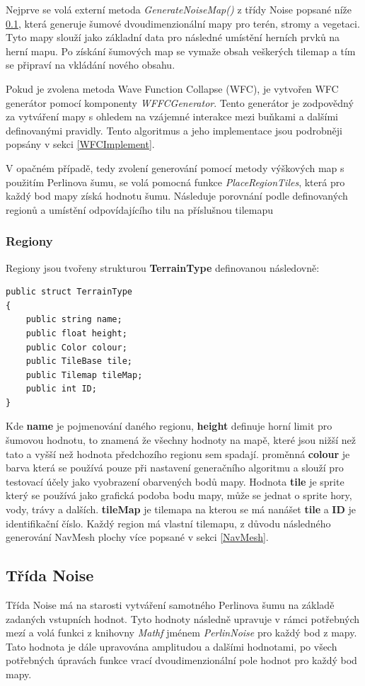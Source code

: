 Nejprve se volá externí metoda \textit{GenerateNoiseMap()} z třídy Noise popsané níže \ref{noiseClass}, která generuje šumové dvoudimenzionální mapy pro terén, stromy a vegetaci. Tyto mapy slouží jako základní data pro následné umístění herních prvků na herní mapu. Po získání šumových map se vymaže obsah veškerých tilemap a tím se připraví na vkládání nového obsahu.

Pokud je zvolena metoda Wave Function Collapse (WFC), je vytvořen WFC generátor pomocí komponenty \textit{WFFCGenerator}. Tento generátor je zodpovědný za vytváření mapy s ohledem na vzájemné interakce mezi buňkami a dalšími definovanými pravidly. Tento algoritmus a jeho implementace jsou podrobněji popsány v sekci \ref{WFCImplement}.

V opačném případě, tedy zvolení generování pomocí metody výškových map s použitím Perlinova šumu, se volá pomocná funkce \textit{PlaceRegionTiles}, která pro každý bod mapy získá hodnotu šumu. Následuje porovnání podle definovaných regionů a umístění odpovídajícího tilu na příslušnou tilemapu

\subsubsection{Regiony}
Regiony jsou tvořeny strukturou \textbf{TerrainType} definovanou následovně:
\begin{lstlisting}
public struct TerrainType
{
	public string name;
	public float height;
	public Color colour;
	public TileBase tile;
	public Tilemap tileMap;
	public int ID;
}
\end{lstlisting}
Kde \textbf{name} je pojmenování daného regionu, \textbf{height} definuje horní limit pro šumovou hodnotu, to znamená že všechny hodnoty na mapě, které jsou nižší než tato a vyšší než hodnota předchozího regionu sem spadají. proměnná \textbf{colour} je barva která se používá pouze při nastavení generačního algoritmu a slouží pro testovací účely jako vyobrazení obarvených bodů mapy. Hodnota \textbf{tile} je sprite který se používá jako grafická podoba bodu mapy, může se jednat o sprite hory, vody, trávy a dalších. \textbf{tileMap} je tilemapa na kterou se má nanášet \textbf{tile} a \textbf{ID} je identifikační číslo. Každý region má vlastní tilemapu, z důvodu následného generování NavMesh plochy více popsané v sekci \ref{NavMesh}.
 
\subsection{Třída Noise}
\label{noiseClass}
Třída Noise má na starosti vytváření samotného Perlinova šumu na základě zadaných vstupních hodnot. Tyto hodnoty následně upravuje v rámci potřebných mezí a volá funkci z knihovny \textit{Mathf} jménem \textit{PerlinNoise} pro každý bod z mapy. Tato hodnota je dále upravována amplitudou a dalšími hodnotami, po všech potřebných úpravách funkce vrací dvoudimenzionální pole hodnot pro každý bod mapy.

